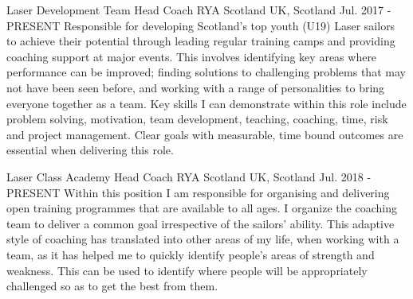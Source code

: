

\begin{cventries}

  \cventry
    {Laser Development Team Head Coach} %
    {RYA Scotland} %
    {UK, Scotland} %
    {Jul. 2017 - PRESENT} %
    {
      Responsible for developing Scotland’s top youth (U19) Laser sailors to achieve their potential through leading regular training camps and providing coaching support at major events. This involves identifying key areas where performance can be improved; finding solutions to challenging problems that may not have been seen before, and working with a range of personalities to bring everyone together as a team. Key skills I can demonstrate within this role include problem solving, motivation, team development, teaching, coaching, time, risk and project management. Clear goals with measurable, time bound outcomes are essential when delivering this role. 
    }

  \cventry
    {Laser Class Academy Head Coach} %
    {RYA Scotland} %
    {UK, Scotland} %
    {Jul. 2018 - PRESENT} %
    {
      Within this position I am responsible for organising and delivering open training programmes that are available to all ages. I organize the coaching team to deliver a common goal irrespective of the sailors’ ability.  This adaptive style of coaching has translated into other areas of my life, when working with a team, as it has helped me to quickly identify people's areas of strength and weakness. This can be used to identify where people will be appropriately challenged so as to get the best from them. 
    }


\end{cventries}
